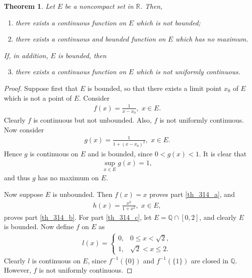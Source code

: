 \documentclass[11pt]{book}
\newtheorem{theorem}{Theorem}[chapter]
\theoremstyle{definition}
\numberwithin{equation}{chapter}
\begin{document}
\medskip

\begin{theorem}\label{th_314}
Let $E$ be a noncompact set in $\mathbb{R}$. Then,
\begin{enumerate}[label=(\alph*)]
    \item there exists a continuous function on $E$ which is not bounded; \label{th_314_a}
    
    \item there exists a continuous and bounded function on $E$ which has no maximum. \label{th_314_b}
\end{enumerate}
If, in addition, $E$ is bounded, then
\begin{enumerate}[label=(\alph*)]
    \setcounter{enumi}{2}
    \item there exists a continuous function on $E$ which is not uniformly continuous. \label{th_314_c}
\end{enumerate}
\end{theorem}
\begin{proof}
Suppose first that $E$ is bounded, so that there exists a limit point $x_0$ of $E$ which is not a point of $E$. Consider
\begin{align*}
    f(x) = \frac{1}{x - x_0}, \,\, x \in E.
\end{align*}
Clearly $f$ is continuous but not unbounded. Also, $f$ is not uniformly continuous. Now consider 
\begin{align*}
    g(x) = \frac{1}{1 + (x - x_0)^2}, \,\, x \in E.
\end{align*}
Hence $g$ is continuous on $E$ and is bounded, since $0 < g(x) < 1$. It is clear that
\begin{align*}
    \sup_{x\in E} g(x) = 1,
\end{align*}
and thus $g$ has no maximum on $E$. 

Now suppose $E$ is unbounded. Then $f(x) = x$ proves part \ref{th_314_a}, and 
\begin{align*}
    h(x) = \frac{x^2}{1 + x^2}, \,\, x \in E,
\end{align*}
proves part \ref{th_314_b}. For part \ref{th_314_c}, let $E = \mathbb{Q} \cap [0,2]$, and clearly $E$ is bounded. Now define $f$ on $E$ as
\begin{align*}
    l(x) = \begin{cases}
        0, & 0 \leq x < \sqrt{2}, \\
        1, & \sqrt{2} < x \leq 2.
    \end{cases}
 \end{align*}
Clearly $l$ is continuous on $E$, since $f^{-1}(\{0\})$ and $f^{-1}(\{1\})$ are closed in $\mathbb{Q}$. However, $f$ is not uniformly continuous.
\end{proof}
\end{document}
